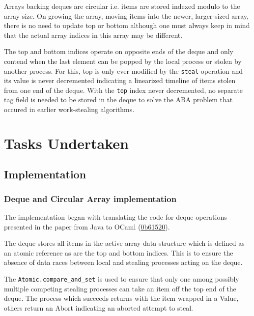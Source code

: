 \documentclass[11pt,a4paper]{article}
\begin{document}
Arrays backing deques are circular i.e. items are stored indexed modulo to the
array size. On growing the array, moving items into the newer, larger-sized
array, there is no need to update top or bottom although one must always keep in
mind that the actual array indices in this array may be different.

The top and bottom indices operate on opposite ends of the deque and only
contend when the last element can be popped by the local process or stolen
by another process. For this, top is only ever modified by the \texttt{steal}
operation and its value is never decremented indicating a linearized timeline of
items stolen from one end of the deque. With the \texttt{top} index never decremented,
no separate tag field is needed to be stored in the deque to solve the ABA
problem that occured in earlier work-stealing algorithms.

\section{Tasks Undertaken}
\label{sec:tasks}

\subsection{Implementation}
\subsubsection{Deque and Circular Array implementation}

The implementation began with translating the code for deque operations
presented in the \cite{chase2005dynamic} paper from Java to OCaml
(\href{https://github.com/alinab/work-steal/commit/0b615206c09ac43fa386bd210dfe0f8d03ed6ad7}{0b61520}).

The deque stores all items in the active array data structure which is defined
as an atomic reference as are the top and bottom indices. This is to ensure the
absence of data races between local and stealing processes acting on the deque.

The \texttt{Atomic.compare\_and\_set} is used to ensure that only one among
possibly multiple competing stealing processes can take an item off the top
end of the deque. The process which succeeds returns with the item wrapped in a
Value, others return an Abort indicating an aborted attempt to steal.
\end{document}
